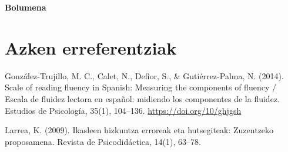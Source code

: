 \documentclass[
]{book}
\begin{document}
\textbf{Bolumena}

\hypertarget{azken-erreferentziak}{%
\section{Azken erreferentziak}\label{azken-erreferentziak}}

González-Trujillo, M. C., Calet, N., Defior, S., \& Gutiérrez-Palma, N. (2014). Scale of reading fluency in Spanish: Measuring the components of fluency / Escala de fluidez lectora en español: midiendo los componentes de la fluidez. Estudios de Psicología, 35(1), 104--136. \url{https://doi.org/10/ghjgsh}

Larrea, K. (2009). Ikasleen hizkuntza erroreak eta hutsegiteak: Zuzentzeko proposamena. Revista de Psicodidáctica, 14(1), 63--78.
\end{document}
